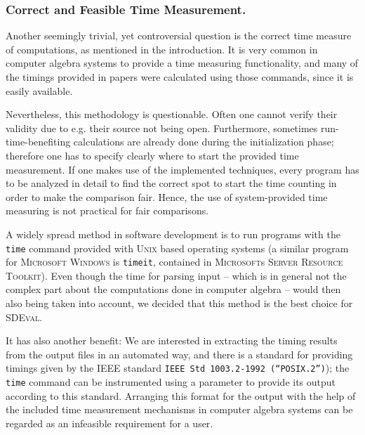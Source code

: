 \documentclass[12pt]{article}
\begin{document}
\subsubsection{Correct and Feasible Time Measurement.} 

Another seemingly trivial, yet controversial question is the correct time
measure of computations, as mentioned in the introduction. It is very common in
computer algebra systems to provide a time measuring functionality, and many of
the timings provided in papers were calculated using those commands, since it
is easily available.

Nevertheless, this methodology is questionable. Often one cannot verify their
validity due to e.g. their source not being open. Furthermore, sometimes
run-time-benefiting calculations are already done during the initialization
phase; therefore one has to specify clearly where to start the provided time
measurement. If one makes use of the implemented techniques, every program has
to be analyzed in detail to find the correct spot to start the time counting in
order to make the comparison fair. Hence, the use of system-provided time
measuring is not practical for fair comparisons.


A widely spread method in software development is to run programs with the
\texttt{time} command provided with \textsc{Unix} based operating systems (a
similar program for \textsc{Microsoft Windows} is \texttt{timeit}, contained in
\textsc{Microsoft}s \textsc{Server Resource Toolkit}). Even though the time for
parsing input -- which is in general not the complex part about the
computations done in computer algebra -- would then also being taken into
account, we decided that this method is the best choice for \textsc{SDEval}.

It has also another benefit: We are interested in extracting the timing results
from the output files in an automated way, and there is a standard for
providing timings given by the \textsc{IEEE} standard \texttt{IEEE Std
  1003.2-1992 (``POSIX.2'')}); the \texttt{time} command can be instrumented
using a parameter to provide its output according to this standard. Arranging
this format for the output with the help of the included time measurement
mechanisms in computer algebra systems can be regarded as an infeasible
requirement for a user.
\end{document}
